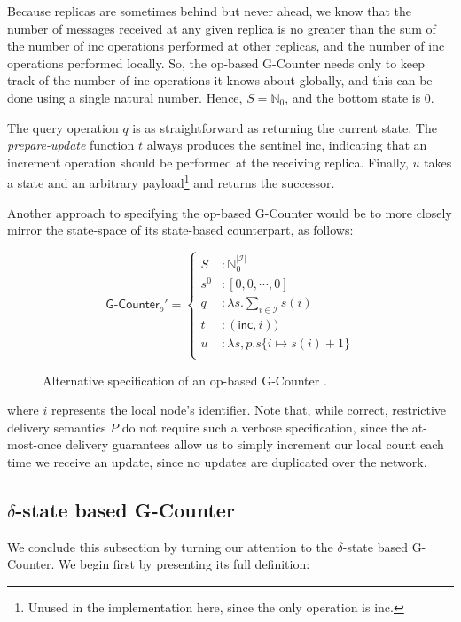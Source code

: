 Because replicas are sometimes behind but never ahead, we know that the number
of messages received at any given replica is no greater than the sum of the
number of \textsf{inc} operations performed at other replicas, and the number of
\textsf{inc} operations performed locally. So, the op-based G-Counter needs only
to keep track of the number of \textsf{inc} operations it knows about globally,
and this can be done using a single natural number. Hence, $S = \mathbb{N}_0$,
and the bottom state is $0$.

The query operation $q$ is as straightforward as returning the current state.
The \emph{prepare-update} function $t$ always produces the sentinel
\textsf{inc}, indicating that an increment operation should be performed at the
receiving replica. Finally, $u$ takes a state and an arbitrary
payload\footnote{Unused in the implementation here, since the only operation is
\textsf{inc}.} and returns the successor.

Another approach to specifying the op-based G-Counter \CRDT would be to more
closely mirror the state-space of its state-based counterpart, as follows:

\begin{figure}[H]
  \centering
  \[
    \textsf{G-Counter}_o' = \left\{\begin{aligned}
      S &: \mathbb{N}_0^{|\mathcal{I}|} \\
      s^0 &: [ 0, 0, \cdots, 0 ] \\
      q &: \lambda s. \sum_{i \in \mathcal{I}} s(i) \\
      t &: (\textsf{inc}, i)) \\
      u &: \lambda s,p. s\{ i \mapsto s(i) + 1 \} \\
    \end{aligned}\right.
  \]
  \caption{Alternative specification of an op-based \textsf{G-Counter} \CRDT.}
\end{figure}

where $i$ represents the local node's identifier. Note that, while correct,
restrictive delivery semantics $P$ do not require such a verbose specification,
since the at-most-once delivery guarantees allow us to simply increment our
local count each time we receive an update, since no updates are duplicated over
the network.

\subsection{$\delta$-state based G-Counter}
We conclude this subsection by turning our attention to the $\delta$-state based
G-Counter. We begin first by presenting its full definition:

